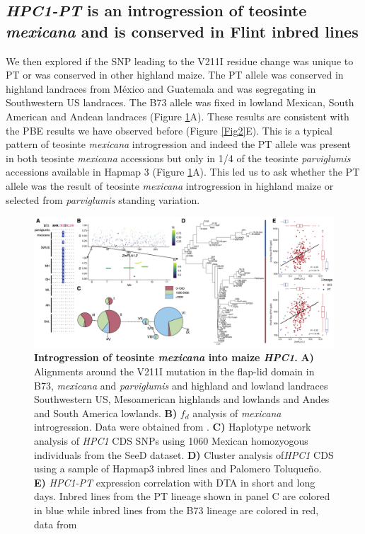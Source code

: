 \documentclass[9pt,twocolumn,twoside,lineno]{BioRxiv}
\begin{document}
\subsection{\textit{HPC1-PT} is an introgression of teosinte \textit{mexicana} and is conserved in Flint inbred lines} 
We then explored if the SNP leading to the V211I residue change was unique to PT or was conserved in other highland maize.
The PT allele was conserved in highland landraces from México and Guatemala and was segregating in Southwestern US landraces. 
The B73 allele was fixed in lowland Mexican, South American and Andean landraces (Figure \ref{Fig6}A). 
These results are consistent with the PBE results we have observed before (Figure \ref{Fig2}E).
This is a typical pattern of teosinte \textit{mexicana} introgression \cite{Wang2020-mp} and indeed the PT allele was present in both teosinte \textit{mexicana} accessions but only in 1/4 of the teosinte \textit{parviglumis} accessions available in Hapmap 3 \cite{Bukowski2017-ng} (Figure \ref{Fig6}A). 
This led us to ask whether the PT allele was the result of teosinte \textit{mexicana} introgression in highland maize or selected from \textit{parviglumis} standing variation.

\begin{figure}[!ht]
\begin{center}
\includegraphics[width=0.8\paperwidth]{Figures/Fig_6.png}
\caption{\textbf{Introgression of teosinte \textit{mexicana} into maize \textit{HPC1}.}  
\textbf{A)} Alignments around the V211I mutation in the flap-lid domain in B73, \textit{mexicana} and \textit{parviglumis} and highland and lowland landraces Southwestern US, Mesoamerican highlands and lowlands and Andes and South America lowlands.
\textbf{B)} \(f_d\) analysis of \textit{mexicana} introgression. Data were obtained from \cite{Gonzalez-Segovia2019-jy}. 
\textbf{C)} Haplotype network analysis of \textit{HPC1} CDS SNPs using 1060 Mexican homozyogous individuals from the SeeD dataset.
\textbf{D)} Cluster analysis of\textit{HPC1} CDS using a sample of Hapmap3 inbred lines and Palomero Toluqueño.
\textbf{E)} \textit{HPC1-PT} expression correlation with DTA in short and long days. 
Inbred lines from the PT lineage shown in panel C are colored in blue while inbred lines from the B73 lineage are colored in red,
data from \cite{Kremling2018-gn}}
\label{Fig6}
\end{center}
\end{figure}
\end{document}
